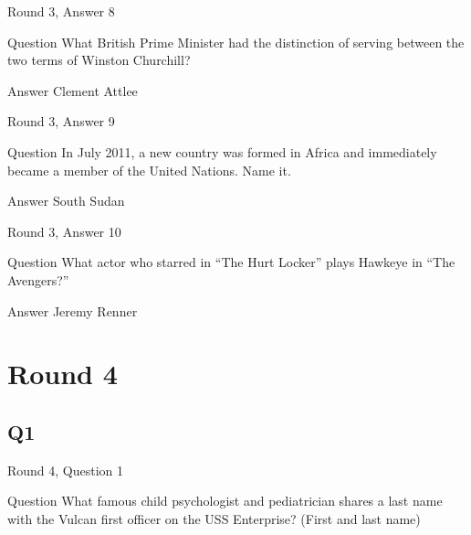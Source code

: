 \documentclass[11pt]{beamer}
\begin{document}
\begin{frame}[t]{Round 3, Answer 8}
\vspace{2em}
\begin{block}{Question}
What British Prime Minister had the distinction of serving between the two terms of Winston Churchill\@?
\end{block}
\pause{}
\begin{block}{Answer}
Clement Attlee
\end{block}
\end{frame}
    

\begin{frame}[t]{Round 3, Answer 9}
\vspace{2em}
\begin{block}{Question}
In July 2011, a new country was formed in Africa and immediately became a member of the United Nations. Name it.
\end{block}
\pause{}
\begin{block}{Answer}
South Sudan
\end{block}
\end{frame}
    

\begin{frame}[t]{Round 3, Answer 10}
\vspace{2em}
\begin{block}{Question}
What actor who starred in ``The Hurt Locker'' plays Hawkeye in ``The Avengers?''
\end{block}
\pause{}
\begin{block}{Answer}
Jeremy Renner
\end{block}
\end{frame}
    

\section{Round 4}
    

\subsection*{Q1}
\begin{frame}[t]{Round 4, Question 1}
\vspace{2em}
\begin{block}{Question}
What famous child psychologist and pediatrician shares a last name with the Vulcan first officer on the USS Enterprise? (First and last name)
\end{block}
\end{frame}
    
\end{document}

